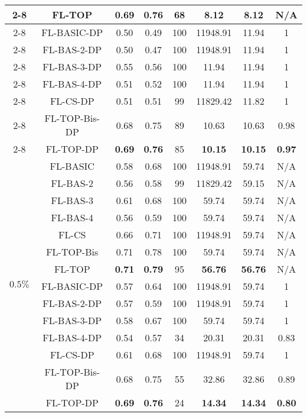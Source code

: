 \documentclass[accepted]{uai2021} %
\begin{document}
\begin{table*}[!ht]
{\begin{tabular}{|c|c|c|c|c|c|c|c|}
        \cline{2-8}
        &  FL-TOP & \textbf{0.69}  & \textbf{0.76} & 68 & \textbf{8.12} & \textbf{8.12} &N/A \\
        \cline{2-8}
        &  FL-BASIC-DP  & 0.50 & 0.49 & 100 & 11948.91 & 11.94 & 1  \\
        \cline{2-8}
        &  FL-BAS-2-DP  & 0.50 & 0.47 & 100 & 11948.91 & 11.94 & 1\\
        \cline{2-8}
        &  FL-BAS-3-DP &  0.55  & 0.56 & 100 & 11.94 & 11.94 & 1\\
        \cline{2-8}
        &  FL-BAS-4-DP &  0.51  & 0.52 & 100 & 11.94 & 11.94 & 1\\
        \cline{2-8}
        &  FL-CS-DP &  0.51  & 0.51 & 99 & 11829.42 & 11.82 & 1\\
        \cline{2-8}
        &  FL-TOP-Bis-DP & 0.68 & 0.75 & 89 & 10.63 & 10.63 & 0.98\\
        \cline{2-8}
        &  FL-TOP-DP &  \textbf{0.69}  & \textbf{0.76} & 85 & \textbf{10.15} & \textbf{10.15} & \textbf{0.97} \\
        \hline 
        \hline
        \multirow{14}{*}{$0.5\%$} &  FL-BASIC  & 0.58 & 0.68 & 100 & 11948.91 & 59.74 & N/A \\
        \cline{2-8}
        &  FL-BAS-2  & 0.56 & 0.58 & 99 & 11829.42 & 59.15 & N/A  \\
        \cline{2-8}
        &  FL-BAS-3 &  0.61  & 0.68 & 100 & 59.74 & 59.74 & N/A \\
        \cline{2-8}
        &  FL-BAS-4 &  0.56  & 0.59 & 100 & 59.74 & 59.74 &N/A \\
        \cline{2-8}
        &  FL-CS &  0.66  & 0.71 & 100 & 11948.91 & 59.74 & N/A \\
        \cline{2-8}
        &  FL-TOP-Bis &  0.71  & 0.78 & 100 & 59.74 & 59.74 &N/A \\
        \cline{2-8}
        &  FL-TOP & \textbf{0.71}  & \textbf{0.79} & 95 & \textbf{56.76} & \textbf{56.76} & N/A \\
        \cline{2-8}
        &  FL-BASIC-DP  & 0.57 & 0.64 & 100 & 11948.91 & 59.74   & 1\\
        \cline{2-8}
        &  FL-BAS-2-DP  & 0.57 & 0.59 & 100 & 11948.91 & 59.74  & 1\\
        \cline{2-8}
        &  FL-BAS-3-DP &  0.58  & 0.67 & 100 & 59.74 & 59.74 & 1\\
        \cline{2-8}
        &  FL-BAS-4-DP &  0.54  & 0.57 & 34 & 20.31 & 20.31 & 0.83\\
        \cline{2-8}
        &  FL-CS-DP &  0.61  & 0.68 & 100 & 11948.91 & 59.74 & 1\\
        \cline{2-8}
        &  FL-TOP-Bis-DP &  0.68  & 0.75 & 55 & 32.86 & 32.86 & 0.89\\
        \cline{2-8}
        &  FL-TOP-DP &  \textbf{0.69}  & \textbf{0.76} & 24 & \textbf{14.34} & \textbf{14.34} & \textbf{0.80}\\
        \hline
        

\end{tabular}}
\end{table*}
\end{document}
